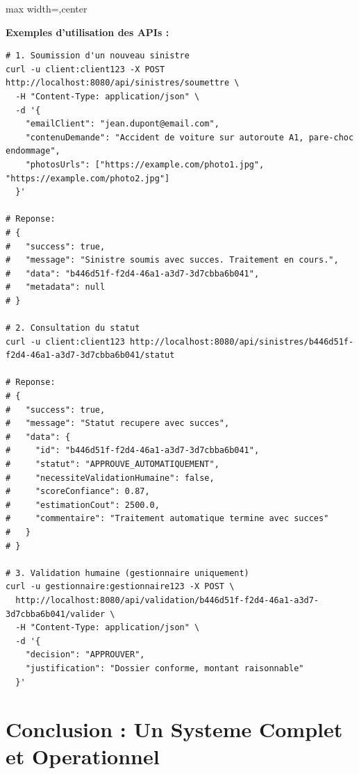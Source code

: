 \documentclass[a4paper,12pt]{article}
\begin{document}
\begin{center}
\begin{adjustbox}{max width=\textwidth,center}
\end{adjustbox}
\end{center}

\textbf{Exemples d'utilisation des APIs :}

\begin{lstlisting}[caption=Exemples d'appels API]
# 1. Soumission d'un nouveau sinistre
curl -u client:client123 -X POST http://localhost:8080/api/sinistres/soumettre \
  -H "Content-Type: application/json" \
  -d '{
    "emailClient": "jean.dupont@email.com",
    "contenuDemande": "Accident de voiture sur autoroute A1, pare-choc endommage",
    "photosUrls": ["https://example.com/photo1.jpg", "https://example.com/photo2.jpg"]
  }'

# Reponse:
# {
#   "success": true,
#   "message": "Sinistre soumis avec succes. Traitement en cours.",
#   "data": "b446d51f-f2d4-46a1-a3d7-3d7cbba6b041",
#   "metadata": null
# }

# 2. Consultation du statut
curl -u client:client123 http://localhost:8080/api/sinistres/b446d51f-f2d4-46a1-a3d7-3d7cbba6b041/statut

# Reponse:
# {
#   "success": true,
#   "message": "Statut recupere avec succes",
#   "data": {
#     "id": "b446d51f-f2d4-46a1-a3d7-3d7cbba6b041",
#     "statut": "APPROUVE_AUTOMATIQUEMENT",
#     "necessiteValidationHumaine": false,
#     "scoreConfiance": 0.87,
#     "estimationCout": 2500.0,
#     "commentaire": "Traitement automatique termine avec succes"
#   }
# }

# 3. Validation humaine (gestionnaire uniquement)
curl -u gestionnaire:gestionnaire123 -X POST \
  http://localhost:8080/api/validation/b446d51f-f2d4-46a1-a3d7-3d7cbba6b041/valider \
  -H "Content-Type: application/json" \
  -d '{
    "decision": "APPROUVER",
    "justification": "Dossier conforme, montant raisonnable"
  }'
\end{lstlisting}

\section{Conclusion : Un Systeme Complet et Operationnel}
\end{document}
